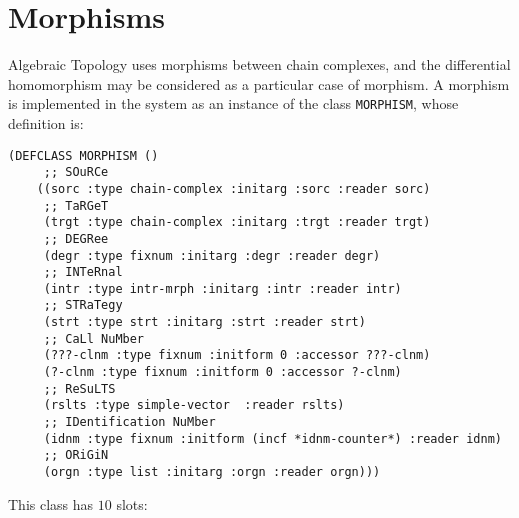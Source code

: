 \newpage

\section {Morphisms}

Algebraic  Topology uses  morphisms between chain complexes, and
the dif\-fe\-ren\-ti\-al homomorphism may be considered as a particular
case of  morphism. A morphism is implemented in the system as an instance
of the class {\tt MORPHISM}, whose definition is:
{\footnotesize\begin{verbatim}
(DEFCLASS MORPHISM ()
     ;; SOuRCe
    ((sorc :type chain-complex :initarg :sorc :reader sorc)
     ;; TaRGeT
     (trgt :type chain-complex :initarg :trgt :reader trgt)
     ;; DEGRee
     (degr :type fixnum :initarg :degr :reader degr)
     ;; INTeRnal
     (intr :type intr-mrph :initarg :intr :reader intr)
     ;; STRaTegy
     (strt :type strt :initarg :strt :reader strt)
     ;; CaLl NuMber
     (???-clnm :type fixnum :initform 0 :accessor ???-clnm)
     (?-clnm :type fixnum :initform 0 :accessor ?-clnm)
     ;; ReSuLTS
     (rslts :type simple-vector  :reader rslts)
     ;; IDentification NuMber
     (idnm :type fixnum :initform (incf *idnm-counter*) :reader idnm)
     ;; ORiGiN
     (orgn :type list :initarg :orgn :reader orgn)))
\end{verbatim}}
This class has $10$ slots:
